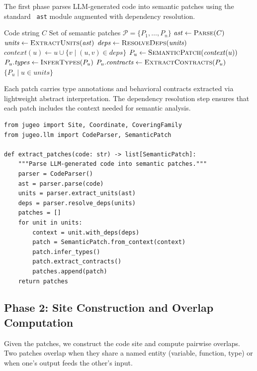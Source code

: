 \documentclass[11pt]{article}
\newcommand{\SemPatch}{\mathcal{P}}
\begin{document}
The first phase parses LLM-generated code into semantic patches using
the standard \Python\ \texttt{ast} module augmented with dependency
resolution.

\begin{algorithm}[t]
\caption{Semantic Patch Extraction}\label{alg:patch-extract}
\begin{algorithmic}[1]
\REQUIRE Code string $C$
\ENSURE Set of semantic patches $\SemPatch = \{P_1, \ldots, P_n\}$
\STATE $\mathit{ast} \leftarrow \textsc{Parse}(C)$
\STATE $\mathit{units} \leftarrow \textsc{ExtractUnits}(\mathit{ast})$
\STATE $\mathit{deps} \leftarrow \textsc{ResolveDeps}(\mathit{units})$
  \STATE $\mathit{context}(u) \leftarrow u \cup \{v \mid (u, v) \in \mathit{deps}\}$
  \STATE $P_u \leftarrow \textsc{SemanticPatch}(\mathit{context}(u))$
  \STATE $P_u.\mathit{types} \leftarrow \textsc{InferTypes}(P_u)$
  \STATE $P_u.\mathit{contracts} \leftarrow \textsc{ExtractContracts}(P_u)$
\ENDFOR
\RETURN $\{P_u \mid u \in \mathit{units}\}$
\end{algorithmic}
\end{algorithm}

Each patch carries type annotations and behavioral contracts extracted
via lightweight abstract interpretation.  The dependency resolution
step ensures that each patch includes the context needed for semantic
analysis.

\begin{lstlisting}
from jugeo import Site, Coordinate, CoveringFamily
from jugeo.llm import CodeParser, SemanticPatch

def extract_patches(code: str) -> list[SemanticPatch]:
    """Parse LLM-generated code into semantic patches."""
    parser = CodeParser()
    ast = parser.parse(code)
    units = parser.extract_units(ast)
    deps = parser.resolve_deps(units)
    patches = []
    for unit in units:
        context = unit.with_deps(deps)
        patch = SemanticPatch.from_context(context)
        patch.infer_types()
        patch.extract_contracts()
        patches.append(patch)
    return patches
\end{lstlisting}


\subsection{Phase 2: Site Construction and Overlap Computation}

Given the patches, we construct the code site and compute pairwise
overlaps.  Two patches overlap when they share a named entity
(variable, function, type) or when one's output feeds the other's
input.
\end{document}

